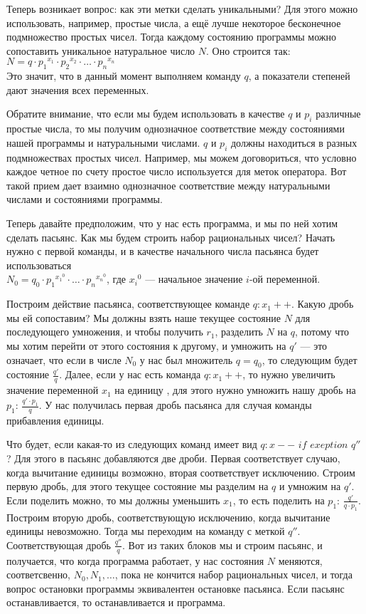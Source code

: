 \documentclass[russian]{lecture-notes}
\begin{document}
	Теперь возникает вопрос: как эти метки сделать уникальными? Для этого можно использовать, например, простые числа, а ещё лучше некоторое бесконечное подмножество простых чисел. Тогда каждому состоянию программы можно сопоставить уникальное натуральное число $N$. Оно строится так: \\ $N = q \cdot {p_1}^{x_1} \cdot {p_2}^{x_2} \cdot \ldots \cdot {p_n}^{x_n}$
	\\ Это значит, что в данный момент выполняем команду $q$, а показатели степеней дают значения всех переменных.
	
	Обратите внимание, что если мы будем использовать в качестве $q$ и $p_i$ различные простые числа, то мы получим однозначное соответствие между состояниями нашей программы и натуральными числами. $q$ и $p_i$ должны находиться в разных подмножествах простых чисел. Например, мы можем договориться, что условно каждое четное по счету простое число используется для меток оператора. Вот такой прием дает взаимно однозначное соответствие между натуральными числами и состояниями программы.
	
	Теперь давайте предположим, что у нас есть программа, и мы по ней хотим сделать пасьянс. Как мы будем строить набор рациональных чисел? Начать нужно с первой команды, и в качестве начального числа пасьянса будет использоваться \\
	$N_0 = q_0 \cdot {p_1}^{{x_1}^0} \cdot \ldots \cdot {p_n}^{{x_n}^0}$, где ${x_i}^0$ --- начальное значение $i$-ой переменной. 
	
	Построим действие пасьянса, соответствующее команде $q: x_1 + +$. Какую дробь мы ей сопоставим? Мы должны взять наше текущее состояние $N$ для последующего умножения, и чтобы получить $r_1$, разделить  $N$  на $q$, потому что мы хотим перейти от этого состояния к другому, и умножить на $q'$ --- это означает, что если в числе $N_0$ у нас был множитель $q = q_0$, то следующим будет состояние $\frac{q'}{q}$. Далее, если у нас есть команда $q: x_1 + +$, то нужно увеличить значение переменной $x_1$ на единицу , для этого нужно умножить нашу дробь на $p_1$: $\frac{q' \cdot {p_1}}{q}$. У нас получилась первая дробь пасьянса для случая команды прибавления единицы.
	
	Что будет, если какая-то из следующих команд имеет вид $q: x - -$ $if$ $exeption$ $q''$? Для этого в пасьянс добавляются две дроби. Первая соответствует случаю, когда вычитание единицы возможно, вторая соответствует исключению. Строим первую дробь, для этого текущее состояние мы разделим на $q$ и умножим на $q'$. Если поделить можно, то мы должны уменьшить $x_1$, то есть поделить на $p_1$: $\frac{q'}{q \cdot {p_1}}$. Построим вторую дробь, соответствующую исключению, когда вычитание единицы невозможно. Тогда мы переходим на команду с меткой $q''$. Соответствующая дробь $\frac{q''}{q}$. Вот из таких блоков мы и строим пасьянс, и получается, что когда программа работает, у нас состояния $N$ меняются, соответсвенно, $N_0, N_1, \ldots$, пока не кончится набор рациональных чисел, и тогда вопрос остановки программы эквивалентен остановке пасьянса. Если пасьянс останавливается, то останавливается и программа.
	
\end{document}
